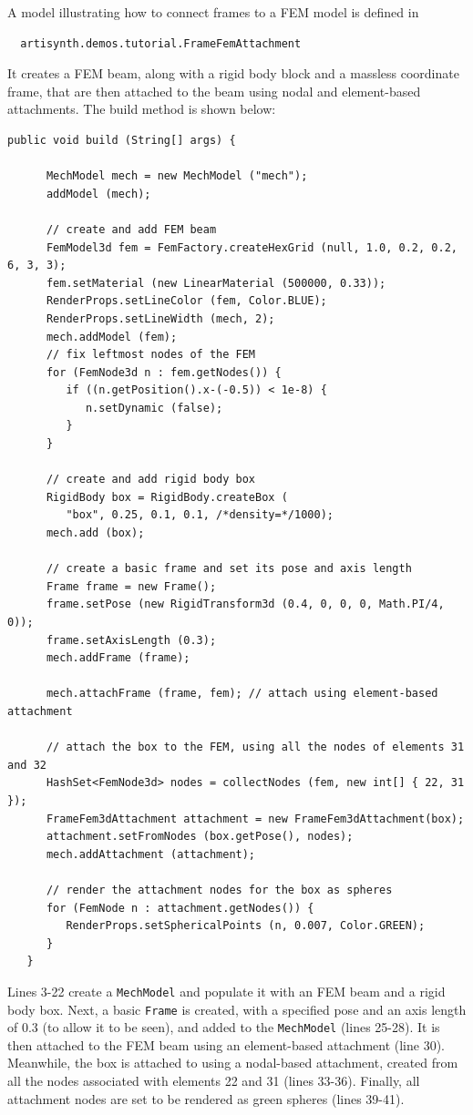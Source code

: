 A model illustrating how to connect frames to a FEM model 
is defined in
%
\begin{verbatim}
  artisynth.demos.tutorial.FrameFemAttachment
\end{verbatim}
%
It creates a FEM beam, along with a rigid body block and a 
massless coordinate frame, that are then attached to the beam
using nodal and element-based attachments. The build method is shown below:
\lstset{numbers=left}
\begin{lstlisting}[]
   public void build (String[] args) {

      MechModel mech = new MechModel ("mech");
      addModel (mech);

      // create and add FEM beam 
      FemModel3d fem = FemFactory.createHexGrid (null, 1.0, 0.2, 0.2, 6, 3, 3);
      fem.setMaterial (new LinearMaterial (500000, 0.33));
      RenderProps.setLineColor (fem, Color.BLUE);
      RenderProps.setLineWidth (mech, 2);
      mech.addModel (fem);
      // fix leftmost nodes of the FEM
      for (FemNode3d n : fem.getNodes()) {
         if ((n.getPosition().x-(-0.5)) < 1e-8) {
            n.setDynamic (false);
         }
      }

      // create and add rigid body box
      RigidBody box = RigidBody.createBox (
         "box", 0.25, 0.1, 0.1, /*density=*/1000);
      mech.add (box);

      // create a basic frame and set its pose and axis length
      Frame frame = new Frame();
      frame.setPose (new RigidTransform3d (0.4, 0, 0, 0, Math.PI/4, 0));
      frame.setAxisLength (0.3);
      mech.addFrame (frame);

      mech.attachFrame (frame, fem); // attach using element-based attachment

      // attach the box to the FEM, using all the nodes of elements 31 and 32
      HashSet<FemNode3d> nodes = collectNodes (fem, new int[] { 22, 31 });
      FrameFem3dAttachment attachment = new FrameFem3dAttachment(box);
      attachment.setFromNodes (box.getPose(), nodes);
      mech.addAttachment (attachment);

      // render the attachment nodes for the box as spheres
      for (FemNode n : attachment.getNodes()) {
         RenderProps.setSphericalPoints (n, 0.007, Color.GREEN);
      }
   }
\end{lstlisting}
\lstset{numbers=none} 
Lines 3-22 create a {\tt MechModel} and populate it with an FEM beam
and a rigid body box. Next, a basic {\tt Frame} is created, with a
specified pose and an axis length of 0.3 (to allow it to be seen), and
added to the {\tt MechModel} (lines 25-28). It is then attached to the
FEM beam using an element-based attachment (line 30).  Meanwhile, the
box is attached to using a nodal-based attachment, created from all
the nodes associated with elements 22 and 31 (lines 33-36). Finally,
all attachment nodes are set to be rendered as green spheres (lines
39-41).

